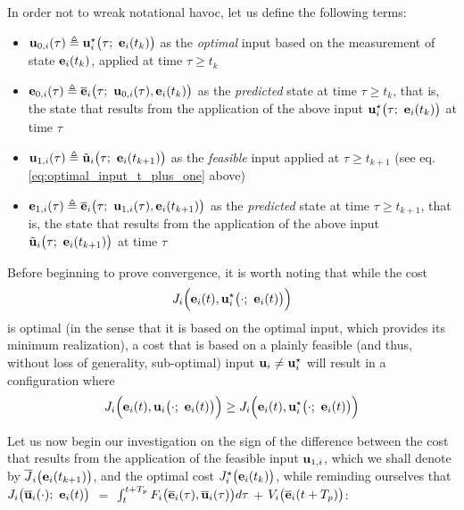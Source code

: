 In order not to wreak notational havoc, let us define the following terms:
\begin{gg_box}
\begin{itemize}
  \item $\bm{\mathbf{u}}_{0,i}(\tau) \triangleq \bm{\mathbf{u}}_i^{\star}\big(\tau;\ \bm{\mathbf{e}}_i(t_k)\big)$
    as the \textit{optimal} input based on the measurement of state
    $\bm{\mathbf{e}}_i(t_k)$, applied at time $\tau \geq t_k$
  \item $\bm{\mathbf{e}}_{0,i}(\tau) \triangleq \overline{\bm{\mathbf{e}}}_i\big(\tau;\ \bm{\mathbf{u}}_{0,i}(\tau), \bm{\mathbf{e}}_i(t_k)\big)$
    as the \textit{predicted} state at time $\tau \geq t_k$, that is,
    the state that results from the application of the above input
    $\vect{u}_i^{\star}\big(\tau;\ \vect{e}_i(t_k)\big)$ at time $\tau$
  \item $\bm{\mathbf{u}}_{1,i}(\tau) \triangleq \tilde{\bm{\mathbf{u}}}_i\big(\tau;\ \bm{\mathbf{e}}_i(t_{k+1})\big)$
    as the \textit{feasible} input applied at $\tau \geq t_{k+1}$ (see eq. \eqref{eq:optimal_input_t_plus_one} above)
  \item $\bm{\mathbf{e}}_{1,i}(\tau) \triangleq \overline{\bm{\mathbf{e}}}_i\big(\tau;\ \bm{\mathbf{u}}_{1,i}(\tau), \bm{\mathbf{e}}_i(t_{k+1})\big)$
    as the \textit{predicted} state at time $\tau \geq t_{k+1}$, that is,
    the state that results from the application of the above input
    $\tilde{\vect{u}}_i\big(\tau;\ \vect{e}_i(t_{k+1})\big)$ at time $\tau$
\end{itemize}
\end{gg_box}

Before beginning to prove convergence, it is worth noting that while the cost
$$J_i \Big(\bm{\mathbf{e}}_i(t), \bm{\mathbf{u}}_i^{\star}\big(\cdot;\ \bm{\mathbf{e}}_i(t)\big)\Big)$$
is optimal (in the sense that it is based on the optimal input, which provides
its minimum realization), a cost that is based on a plainly feasible
(and thus, without loss of generality, sub-optimal) input
$\bm{\mathbf{u}}_i \not= \bm{\mathbf{u}}_i^{\star}$ will result in a configuration where
\begin{equation}
J_i \Big(\vect{e}_i(t), \vect{u}_i\big(\cdot;\ \vect{e}_i(t)\big)\Big)
\geq J_i \Big(\vect{e}_i(t), \vect{u}_i^{\star}\big(\cdot;\ \vect{e}_i(t)\big)\Big)
\end{equation}

Let us now begin our investigation on the sign of the difference between the cost
that results from the application of the feasible input $\bm{\mathbf{u}}_{1,i}$,
which we shall denote by $\overline{J}_i\big(\bm{\mathbf{e}}_i(t_{k+1})\big)$,
and the optimal cost $J_i^{\star}\big(\bm{\mathbf{e}}_i(t_k)\big)$, while reminding
ourselves that
$J_i \big(\overline{\bm{\mathbf{u}}}_i (\cdot);\ \bm{\mathbf{e}}_i(t)\big)$ $=$
$\int_{t}^{t + T_p} F_i \big(\overline{\bm{\mathbf{e}}}_i(\tau), \overline{\bm{\mathbf{u}}}_i (\tau)\big) d \tau$ $+$
$V_i \big(\overline{\bm{\mathbf{e}}}_i (t + T_p)\big)$:

